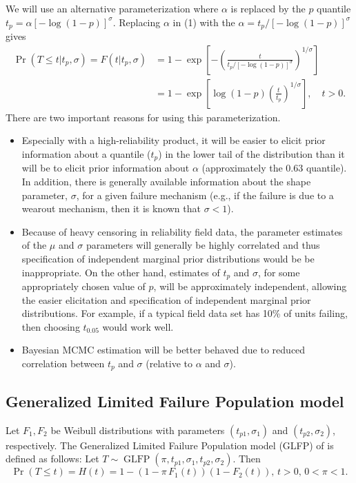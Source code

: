 \documentclass[12pt]{article}
\newcommand{\op}{\operatorname}
\begin{document}
We will use an alternative parameterization
where $\alpha$ is replaced by the $p$ quantile $t_{p}=\alpha \left
[-\log(1-p)\right ]^{\sigma}$. Replacing $\alpha$ in (1) with the
$\alpha=t_{p}/[-\log(1-p)]^{\sigma}$ gives
\begin{align*}
\nonumber
\Pr(T \leq t|t_{p},\sigma ) = F(t|t_{p},\sigma)&=1-
\exp \left [-\left (\frac{t}{t_{p}/[-\log(1-p)]^{\sigma}} \right )^{1/ \sigma}
\right ]\\
\label{equation:reparameterized.weibull.cdf}
&=1 - \exp\left[\log(1-p)\left(\frac{t}{t_{p}}\right)^{1/\sigma}\right], \quad t > 0.
\end{align*}
There are two important reasons for using this parameterization.
\begin{itemize}
\item
Especially with a high-reliability product, it will be easier to
elicit prior information about a quantile  ($t_p$) in the lower tail of the
distribution than it will be to elicit prior information about
$\alpha$ (approximately the $0.63$ quantile). In addition, there is generally available
information about the shape parameter, $\sigma$, for a given failure
mechanism (e.g., if the failure is due to a wearout mechanism, then
it is known that $\sigma<1$). 
\item
Because of heavy censoring in reliability field data, the parameter
estimates of the $\mu$ and $\sigma$ parameters will generally be
highly correlated and thus specification of independent marginal
prior distributions would be be inappropriate. On the other hand,
estimates of $t_{p}$ and $\sigma$, for some appropriately chosen
value of $p$, will be approximately independent, allowing the easier
elicitation and specification of independent marginal prior
distributions. For example, if a typical field data set has 10\% of units
failing, then choosing $t_{0.05}$ would 
work well.
\item Bayesian MCMC estimation will be better behaved due to reduced correlation between $t_p$ and $\sigma$ (relative to $\alpha$ and $\sigma$).
\end{itemize}

\subsection{Generalized Limited Failure Population model}
\label{subsec:GLFP model}
Let $F_1,F_2$ be Weibull distributions with parameters $(t_{p1},\sigma_1)$ and $(t_{p2}, \sigma_2)$, respectively.
The Generalized Limited Failure Population model (GLFP) of \citet{chan} is defined as follows: Let $T \sim \op{GLFP}(\pi, t_{p1},\sigma_1,t_{p2},\sigma_2)$. Then
$$\Pr(T \le t) = H(t) = 1 - (1-\pi\, F_{1}(t))(1 - F_{2}(t)),\, t>0,\, 0 < \pi < 1.$$
\end{document}
